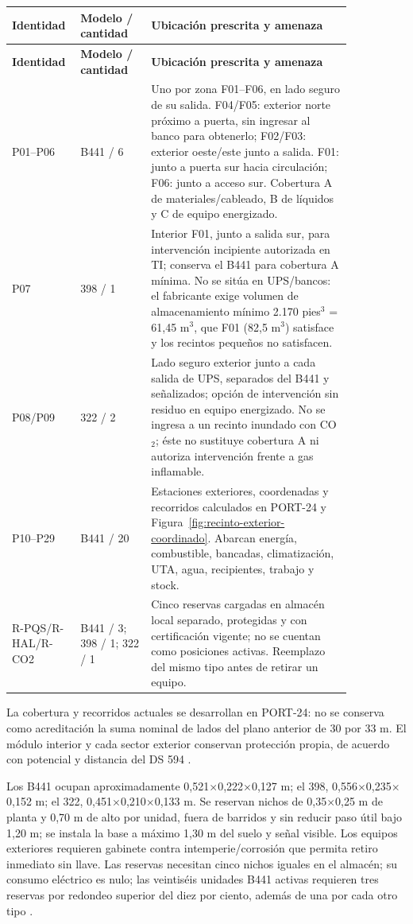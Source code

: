\begin{longtable}{|p{0.12\linewidth}|p{0.19\linewidth}|p{0.54\linewidth}|}
\hline \textbf{Identidad} & \textbf{Modelo / cantidad} & \textbf{Ubicación prescrita y amenaza} \\\hline
\endfirsthead
\hline \textbf{Identidad} & \textbf{Modelo / cantidad} & \textbf{Ubicación prescrita y amenaza} \\\hline
\endhead
P01--P06 & B441 / 6 & Uno por zona F01--F06, en lado seguro de su salida. F04/F05: exterior norte próximo a puerta, sin ingresar al banco para obtenerlo; F02/F03: exterior oeste/este junto a salida. F01: junto a puerta sur hacia circulación; F06: junto a acceso sur. Cobertura A de materiales/cableado, B de líquidos y C de equipo energizado. \\\hline
P07 & 398 / 1 & Interior F01, junto a salida sur, para intervención incipiente autorizada en TI; conserva el B441 para cobertura A mínima. No se sitúa en UPS/bancos: el fabricante exige volumen de almacenamiento mínimo 2.170 pies$^3$ = 61,45 m$^3$, que F01 (82,5 m$^3$) satisface y los recintos pequeños no satisfacen. \\\hline
P08/P09 & 322 / 2 & Lado seguro exterior junto a cada salida de UPS, separados del B441 y señalizados; opción de intervención sin residuo en equipo energizado. No se ingresa a un recinto inundado con CO$_2$; éste no sustituye cobertura A ni autoriza intervención frente a gas inflamable. \\\hline
P10--P29 & B441 / 20 & Estaciones exteriores, coordenadas y recorridos calculados en PORT-24 y Figura~\ref{fig:recinto-exterior-coordinado}. Abarcan energía, combustible, bancadas, climatización, UTA, agua, recipientes, trabajo y stock. \\\hline
R-PQS/R-HAL/R-CO2 & B441 / 3; 398 / 1; 322 / 1 & Cinco reservas cargadas en almacén local separado, protegidas y con certificación vigente; no se cuentan como posiciones activas. Reemplazo del mismo tipo antes de retirar un equipo. \\\hline
\end{longtable}

La cobertura y recorridos actuales se desarrollan en PORT-24: no se conserva como acreditación la suma nominal de lados del plano anterior de 30 por 33 m. El módulo interior y cada sector exterior conservan protección propia, de acuerdo con potencial y distancia del DS 594 \parencite[arts.~45--49]{l21-ds594}.

Los B441 ocupan aproximadamente 0,521$\times$0,222$\times$0,127 m; el 398, 0,556$\times$0,235$\times$0,152 m; el 322, 0,451$\times$0,210$\times$0,133 m. Se reservan nichos de 0,35$\times$0,25 m de planta y 0,70 m de alto por unidad, fuera de barridos y sin reducir paso útil bajo 1,20 m; se instala la base a máximo 1,30 m del suelo y señal visible. Los equipos exteriores requieren gabinete contra intemperie/corrosión que permita retiro inmediato sin llave. Las reservas necesitan cinco nichos iguales en el almacén; su consumo eléctrico es nulo; las veintiséis unidades B441 activas requieren tres reservas por redondeo superior del diez por ciento, además de una por cada otro tipo \parencites[pp.~9, 11--12]{l21-amerex}[arts.~47/49]{l21-ds594}.


